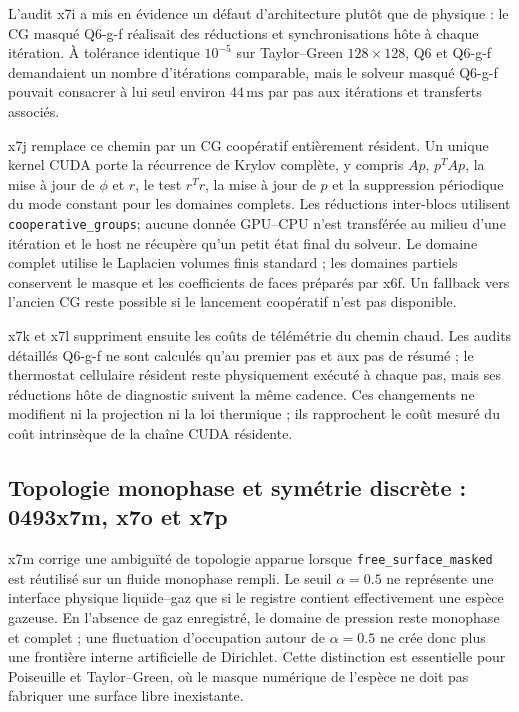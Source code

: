 \documentclass[11pt,a4paper]{article}
\begin{document}
L'audit x7i a mis en évidence un défaut d'architecture plutôt que de physique : le CG masqué Q6-g-f réalisait des réductions et synchronisations hôte à chaque itération. À tolérance identique $10^{-5}$ sur Taylor--Green $128\times128$, Q6 et Q6-g-f demandaient un nombre d'itérations comparable, mais le solveur masqué Q6-g-f pouvait consacrer à lui seul environ $44\,\mathrm{ms}$ par pas aux itérations et transferts associés.

x7j remplace ce chemin par un CG coopératif entièrement résident. Un unique kernel CUDA porte la récurrence de Krylov complète, y compris $Ap$, $p^TAp$, la mise à jour de $\phi$ et $r$, le test $r^Tr$, la mise à jour de $p$ et la suppression périodique du mode constant pour les domaines complets. Les réductions inter-blocs utilisent \texttt{cooperative\_groups}; aucune donnée GPU--CPU n'est transférée au milieu d'une itération et le host ne récupère qu'un petit état final du solveur. Le domaine complet utilise le Laplacien volumes finis standard ; les domaines partiels conservent le masque et les coefficients de faces préparés par x6f. Un fallback vers l'ancien CG reste possible si le lancement coopératif n'est pas disponible.

x7k et x7l suppriment ensuite les coûts de télémétrie du chemin chaud. Les audits détaillés Q6-g-f ne sont calculés qu'au premier pas et aux pas de résumé ; le thermostat cellulaire résident reste physiquement exécuté à chaque pas, mais ses réductions hôte de diagnostic suivent la même cadence. Ces changements ne modifient ni la projection ni la loi thermique ; ils rapprochent le coût mesuré du coût intrinsèque de la chaîne CUDA résidente.

\subsection{Topologie monophase et symétrie discrète : 0493x7m, x7o et x7p}

x7m corrige une ambiguïté de topologie apparue lorsque \texttt{free\_surface\_masked} est réutilisé sur un fluide monophase rempli. Le seuil $\alpha=0.5$ ne représente une interface physique liquide--gaz que si le registre contient effectivement une espèce gazeuse. En l'absence de gaz enregistré, le domaine de pression reste monophase et complet ; une fluctuation d'occupation autour de $\alpha=0.5$ ne crée donc plus une frontière interne artificielle de Dirichlet. Cette distinction est essentielle pour Poiseuille et Taylor--Green, où le masque numérique de l'espèce ne doit pas fabriquer une surface libre inexistante.
\end{document}
